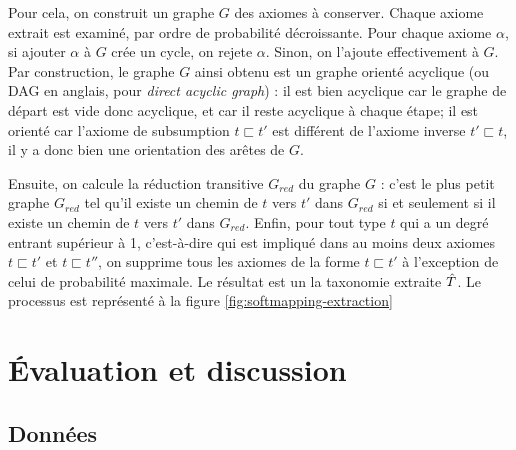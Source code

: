 Pour cela, on construit un graphe $G$ des axiomes à conserver. Chaque axiome extrait est examiné, par ordre de probabilité décroissante. Pour chaque axiome $\alpha$, si ajouter $\alpha$ à $G$ crée un cycle, on rejete $\alpha$. Sinon, on l'ajoute effectivement à $G$. Par construction, le graphe $G$ ainsi obtenu est un graphe orienté acyclique (ou DAG en anglais, pour \textit{direct acyclic graph}) : il est bien acyclique car le graphe de départ est vide donc acyclique, et car il reste acyclique à chaque étape; il est orienté car l'axiome de subsumption $t \sqsubset t'$ est différent de l'axiome inverse $t' \sqsubset t$, il y a donc bien une orientation des arêtes de $G$. 

Ensuite, on calcule la réduction transitive $G_{red}$ du graphe $G$ : c'est le plus petit graphe $G_{red}$ tel qu'il existe un chemin de $t$ vers $t'$ dans $G_{red}$ si et seulement si il existe un chemin de $t$ vers $t'$ dans $G_{red}$. Enfin, pour tout type $t$ qui a un degré entrant supérieur à 1, c'est-à-dire qui est impliqué dans au moins deux axiomes $t \sqsubset t'$ et $t\sqsubset t''$, on supprime tous les axiomes de la forme $t \sqsubset t'$ à l'exception de celui de probabilité maximale. Le résultat est un la taxonomie extraite $\hat{T}$. Le processus est représenté à la figure \ref{fig:softmapping-extraction}



\section{Évaluation et discussion}
\label{sec:te-evaluation}

\subsection{Données}
\label{sec:te-data}

